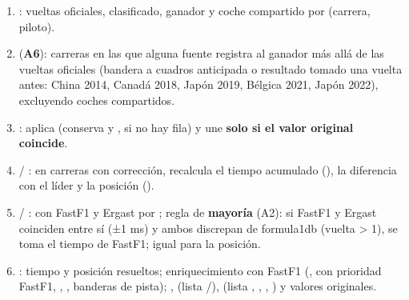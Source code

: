 \begin{enumerate}
\item {}: vueltas oficiales, clasificado, ganador y coche compartido por (carrera, piloto).
\item {} (\textbf{A6}): carreras en las que alguna fuente registra al ganador más allá de las vueltas oficiales (bandera a cuadros anticipada o resultado tomado una vuelta antes: China 2014, Canadá 2018, Japón 2019, Bélgica 2021, Japón 2022), excluyendo coches compartidos.
\item {}: aplica  (conserva  y ,  si no hay fila) y une  \textbf{solo si el valor original coincide}.
\item {} / : en carreras con corrección, recalcula el tiempo acumulado (), la diferencia con el líder y la posición ().
\item {} / :  con FastF1 y Ergast por ; regla de \textbf{mayoría} (A2): si FastF1 y Ergast coinciden entre sí (±1 ms) y ambos discrepan de formula1db (vuelta > 1), se toma el tiempo de FastF1; igual para la posición.
\item {}: tiempo y posición resueltos; enriquecimiento con FastF1 (,  con prioridad FastF1, , , banderas de pista); ,  (lista /),  (lista , , , ) y valores originales.

\end{enumerate}
